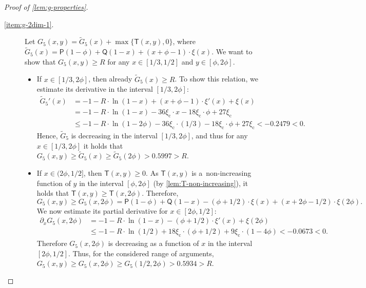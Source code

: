 \documentclass[a4paper,USenglish,cleveref]{lipics-v2019}
\newcommand{\R}{\ensuremath{R}}
\newcommand{\smallBoundary}{\ensuremath{\phi}}
\newcommand{\gconst}{\ensuremath{\xi_\mathrm{c}}}
\newcommand{\g}{\ensuremath{\xi}}
\newcommand{\water}{\textsf{Q}}
\newcommand{\cutintegral}{\textsf{P}}
\newcommand{\T}{\textsf{T}}
\begin{document}
\begin{proof}[Proof of \cref{lem:g-properties}]
\begin{description}
\item[\cref{item:g-2dim-1}.]
Let $G_5(x,y) = \tilde{G}_5(x) + \max \{\T(x,y), 0 \}$,
where $\tilde{G}_5(x) = \cutintegral(1-\smallBoundary) + \water(1-x) + (x + \smallBoundary - 1) \cdot \g(x)$.
We want to show that $G_5(x,y) \geq \R$ for any $x \in [1/3, 1/2]$
and $y \in [\smallBoundary, 2\smallBoundary]$. 
\begin{itemize}
\item If $x \in [1/3,2 \smallBoundary]$, then already $\tilde{G}_5(x) \geq \R$. To show this relation,
we estimate its derivative in the interval $[1/3, 2\smallBoundary]$:
\begin{align*}
  \tilde{G}_5'(x)
  & = -1 - \R\cdot \ln (1-x) + (x + \smallBoundary - 1) \cdot \g'(x) + \g(x) \\
  & = -1 - \R\cdot \ln (1-x) - 36 \gconst \cdot x - 18 \gconst \cdot \smallBoundary + 27 \gconst \\
  & \leq -1 - \R\cdot \ln (1-2 \smallBoundary) - 36 \gconst \cdot (1/3) - 18 \gconst \cdot \smallBoundary +
  27 \gconst < -0.2479 < 0.
\end{align*}
Hence, $\tilde{G}_5$ is decreasing in the interval $[1/3, 2 \smallBoundary]$, and thus for any 
$x \in [1/3, 2\smallBoundary]$ it holds that 
$G_5(x,y) \geq \tilde{G}_5(x) \geq \tilde{G}_5(2 \smallBoundary) > 0.5997 > \R$.

\item If $x \in (2 \smallBoundary, 1/2]$, then $\T(x,y) \geq 0$. 
As $\T(x,y)$ is a~non-increasing function of $y$ in the interval $[\smallBoundary, 2\smallBoundary]$ 
(by \cref{lem:T-non-increasing}), it holds that $\T(x,y) \geq \T(x,2\smallBoundary)$. Therefore,
\[
  G_5(x,y) \geq G_5(x, 2\smallBoundary)
    = \cutintegral(1-\smallBoundary) + \water(1-x) - (\smallBoundary + 1/2) \cdot \g(x) 
    + (x+2\smallBoundary-1/2) \cdot \g(2\smallBoundary).
\]
We now estimate its partial derivative for $x \in [2 \smallBoundary, 1/2]$:
\begin{align*}
  \partial_x G_5(x, 2\smallBoundary)
  & = -1 - \R \cdot \ln (1-x) - (\smallBoundary + 1/2) \cdot \g'(x) + \g(2\smallBoundary) \\ 
  & \leq -1 - \R \cdot \ln(1/2) + 18 \gconst \cdot (\smallBoundary + 1/2) + 9 \gconst \cdot (1 - 4 \smallBoundary) 
   < -0.0673 < 0.
\end{align*}
Therefore $G_5(x,2\smallBoundary)$ is decreasing as a function of $x$ in the
interval $[2\smallBoundary, 1/2]$. Thus, for the considered range of arguments,
$G_5(x,y) \geq G_5(x,2\smallBoundary) \geq G_5(1/2, 2\smallBoundary) > 0.5934 >
\R$. 
\end{itemize}


\end{description}
\end{proof}
\end{document}
